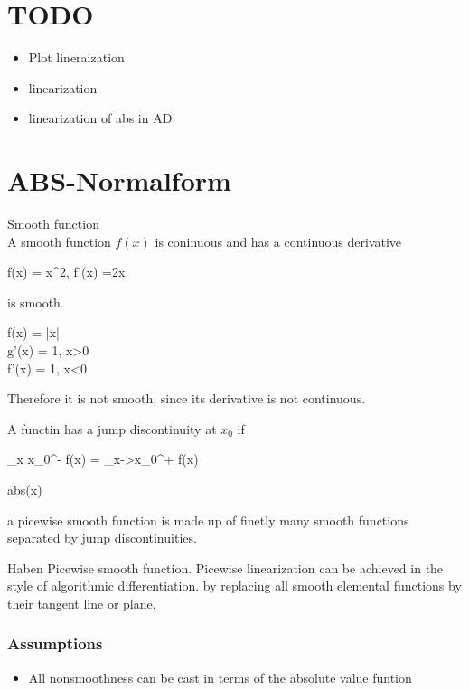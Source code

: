 \section{TODO}
\begin{itemize}
	\item Plot lineraization
	\item linearization
	\item linearization of abs in AD
\end{itemize}
\section{ABS-Normalform}
\begin{mydef}
	Smooth function \\
	A smooth function $f(x)$ is coninuous and has a continuous derivative
\end{mydef}
\begin{mybei}
	\begin{flalign*}
		f(x) = x^2, f'(x) =2x
	\end{flalign*}
	is smooth.
	\begin{flalign*}
		f(x) = |x| \\
		g'(x) = 1, x>0 \\
		f'(x) = 1, x<0 \\
	\end{flalign*}
	Therefore it is not smooth, since its derivative is not continuous.
\end{mybei}
\begin{mydef}
	A functin has a jump discontinuity at $x_0$ if 
	\begin{flalign*}
		\lim\limits_{x \rightarrow x_0^-} f(x) \not = \lim\limits_{x->x_0^+} f(x)
	\end{flalign*}
\end{mydef}
\begin{mybei}
	abs(x)
\end{mybei}
\begin{mydef}
	a picewise smooth function is made up of finetly many smooth functions separated by jump discontinuities.
\end{mydef}

Haben Picewise smooth function. Picewise linearization can be achieved in the style of algorithmic differentiation. by replacing all smooth elemental functions by their tangent line or plane.


\subsubsection{Assumptions}
\begin{itemize}
	\item All nonsmoothness can be cast in terms of the absolute value funtion
\end{itemize}

